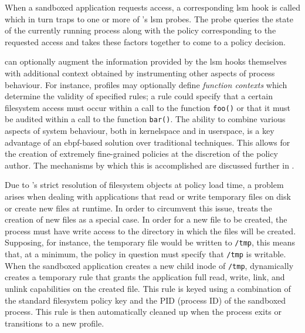 
When a sandboxed application requests access, a corresponding \gls{lsm} hook is called which in
turn traps to one or more of \bpfbox{}'s \gls{lsm} probes. The probe queries the state of the
currently running process along with the policy corresponding to the requested access and
takes these factors together to come to a policy decision.


\bpfbox{} can optionally augment the information provided by the \gls{lsm} hooks themselves with
additional context obtained by instrumenting other aspects of process behaviour. For
instance, profiles may optionally define \textit{function contexts} which determine the
validity of specified rules; a rule could specify that a certain filesystem access must
occur within a call to the function \texttt{foo()} or that it must be audited within
a call to the function \texttt{bar()}. The ability to combine various aspects of system
behaviour, both in kernelspace and in userspace, is a key advantage of an \gls{ebpf}-based
solution over traditional techniques. This allows for the creation of extremely
fine-grained policies at the discretion of the policy author. The mechanisms by which this
is accomplished are discussed further in .

Due to \bpfbox{}'s strict resolution of filesystem objects at policy load time, a problem
arises when dealing with applications that read or write temporary files on disk or create
new files at runtime. In order to circumvent this issue, \bpfbox{} treats the creation of
new files as a special case. In order for a new file to be created, the process must have
write access to the directory in which the files will be created.  Supposing, for
instance, the temporary file would be written to \texttt{/tmp}, this means that, at
a minimum, the policy in question must specify that \texttt{/tmp} is writable.  When the
sandboxed application creates a new child inode of \texttt{/tmp}, \bpfbox{} dynamically
creates a temporary rule that grants the application full read, write, link, and unlink
capabilities on the created file. This rule is keyed using a combination of the standard
filesystem policy key and the PID (process ID) of the sandboxed process. This rule is then
automatically cleaned up when the process exits or transitions to a new profile.

